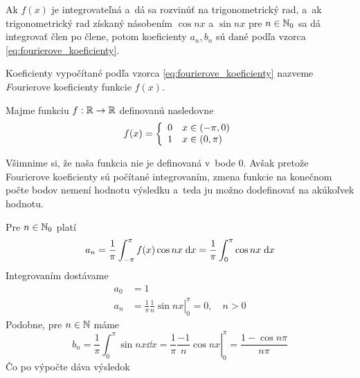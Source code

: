 Ak $f(x)$ je integrovateľná a~dá sa rozvinúť na
trigonometrický rad, a~ak trigonometrický rad získaný násobením
$\cos nx$ a $\sin nx$ pre $n\in \mathbb{N}_0$ sa dá integrovať člen po člene,
potom koeficienty $a_n, b_n$ sú dané podľa vzorca
\eqref{eq:fourierove_koeficienty}.

\begin{definicia}
    Koeficienty vypočítané podľa vzorca
    \eqref{eq:fourierove_koeficienty} nazveme 
    {\emph Fourierove koeficienty funkcie $f(x)$}.
\end{definicia}


\begin{priklad}
Majme funkciu $f:{\mathbb R}\rightarrow{\mathbb R}$ definovanú nasledovne
    \begin{equation*}
        f(x) = \left\{
            \begin{array}{l l}
                0 \quad x \in (-\pi,0) \\
                1 \quad x \in (0,\pi)
            \end{array}
        \right.
    \end{equation*}
% 
    \begin{poznamka}
        Všimnime si, že naša funkcia nie je definovaná v~bode 0.
        Avšak pretože Fourierove koeficienty sú počítané integrovaním,
        zmena funkcie na konečnom počte bodov nemení hodnotu výsledku
        a~teda ju možno dodefinovať na akúkoľvek hodnotu.
    \end{poznamka}
%
    Pre $n \in \mathbb{N}_0$ platí
    \begin{equation}
        a_n = \frac{1}{\pi} \int_{-\pi}^{\pi} f(x) \cos nx \; \mathrm{d} x =
        \frac{1}{\pi} \int_0^{\pi} \cos nx \; \mathrm{d} x
    \end{equation}
    Integrovaním dostávame
    \begin{equation*}
    \begin{split}
        a_0 &= 1 \\
        a_n &= \frac{1}{\pi} \left. \frac{1}{n} \sin nx
        \right|_0^{\pi} = 0, \quad n>0        
    \end{split}
    \end{equation*}
%
    Podobne, pre $n\in \mathbb{N}$ máme
    \begin{equation*}
        b_n = \frac{1}{\pi} \int_0^{\pi} \sin nx \dd x =
           \frac{1}{\pi} \left. \frac{-1}{n} \cos nx \right|_0^{\pi} =
           \frac{1 - \cos n\pi}{n\pi}
    \end{equation*}
    Čo po výpočte dáva výsledok

\end{priklad}
